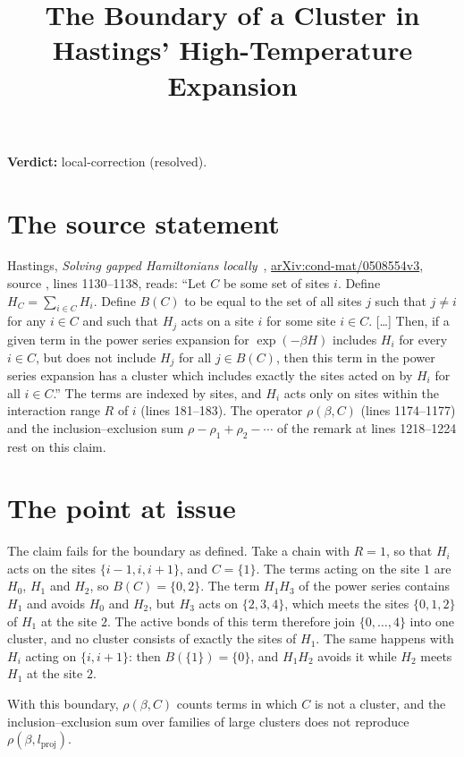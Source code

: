 \documentclass{article}
\title{The Boundary of a Cluster in Hastings' High-Temperature Expansion}
\author{}
\date{}
\providecommand{\gapnote}[2]{\par\noindent\textbf{Verdict:} #1 (#2).\par}
\begin{document}
\maketitle
\gapnote{local-correction}{resolved}

\section{The source statement}
Hastings, \emph{Solving gapped Hamiltonians locally}~\cite{Hastings2006Solving},
\href{https://arxiv.org/abs/cond-mat/0508554v3}{arXiv:cond-mat/0508554v3},
source , lines 1130--1138, reads:
``Let $C$ be some set of sites $i$. Define $H_C=\sum_{i\in C}H_i$. Define
$B(C)$ to be equal to the set of all sites $j$ such that $j\neq i$ for any
$i\in C$ and such that $H_j$ acts on a site $i$ for some site $i\in C$. [\dots]
Then, if a given term in the power series expansion for $\exp(-\beta H)$
includes $H_i$ for every $i\in C$, but does not include $H_j$ for all $j\in
B(C)$, then this term in the power series expansion has a cluster which
includes exactly the sites acted on by $H_i$ for all $i\in C$.''
The terms are indexed by sites, and $H_i$ acts only on sites within the
interaction range $R$ of $i$ (lines 181--183). The operator $\rho(\beta,C)$
(lines 1174--1177) and the inclusion--exclusion sum
$\rho-\rho_1+\rho_2-\cdots$ of the remark at lines 1218--1224 rest on this
claim.

\section{The point at issue}
The claim fails for the boundary as defined. Take a chain with $R=1$, so that
$H_i$ acts on the sites $\{i-1,i,i+1\}$, and $C=\{1\}$. The terms acting on the
site $1$ are $H_0$, $H_1$ and $H_2$, so $B(C)=\{0,2\}$. The term $H_1H_3$ of
the power series contains $H_1$ and avoids $H_0$ and $H_2$, but $H_3$ acts on
$\{2,3,4\}$, which meets the sites $\{0,1,2\}$ of $H_1$ at the site $2$. The
active bonds of this term therefore join $\{0,\dots,4\}$ into one cluster, and
no cluster consists of exactly the sites of $H_1$. The same happens with
$H_i$ acting on $\{i,i+1\}$: then $B(\{1\})=\{0\}$, and $H_1H_2$ avoids it
while $H_2$ meets $H_1$ at the site $2$.

With this boundary, $\rho(\beta,C)$ counts terms in which $C$ is not a
cluster, and the inclusion--exclusion sum over families of large clusters
does not reproduce $\rho(\beta,l_{\mathrm{proj}})$.
\end{document}
